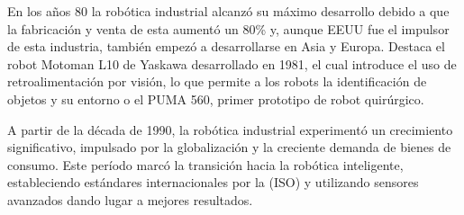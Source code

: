 En los años 80 la robótica industrial alcanzó su máximo desarrollo debido a que la fabricación y venta de esta aumentó un 80\% y, aunque EEUU fue el impulsor de esta industria, también empezó a desarrollarse en Asia y Europa. Destaca el robot Motoman L10 de Yaskawa desarrollado en 1981, el cual introduce el uso de retroalimentación por visión, lo que permite a los robots la identificación de objetos y su entorno o el PUMA 560, primer prototipo de robot quirúrgico. 

A partir de la década de 1990, la robótica industrial experimentó un crecimiento significativo, impulsado por la globalización y la creciente demanda de bienes de consumo. Este período marcó la transición hacia la robótica inteligente, estableciendo estándares internacionales por la (ISO) y utilizando sensores avanzados dando lugar a mejores resultados. 

